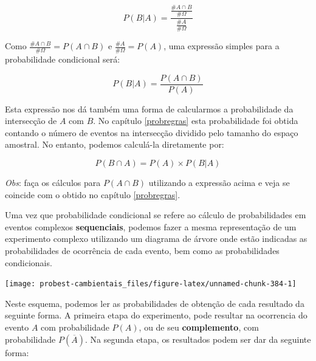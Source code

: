 \documentclass[
]{book}
\begin{document}
\[P(B|A) = \frac{\frac{\#A \cap B}{\#\Omega}}{\frac{\#A}{\#\Omega}}\]

Como \(\frac{\#A \cap B}{\#\Omega} = P(A \cap B)\) e \(\frac{\#A}{\#\Omega} = P(A)\), uma expressão simples para a probabilidade condicional será:

\[P(B|A) = \frac{P(A \cap B)}{P(A)}\]

Esta expressão nos dá também uma forma de calcularmos a probabilidade da intersecção de \(A\) com \(B\). No capítulo \ref{probregras} esta probabilidade foi obtida contando o número de eventos na intersecção dividido pelo tamanho do espaço amostral. No entanto, podemos calculá-la diretamente por:

\[P(B \cap A) = P(A) \times P(B|A)\]

\emph{Obs}: faça os cálculos para \(P(A \cap B)\) utilizando a expressão acima e veja se coincide com o obtido no capítulo \ref{probregras}.

Uma vez que probabilidade condicional se refere ao cálculo de probabilidades em eventos complexos \textbf{sequenciais}, podemos fazer a mesma representação de um experimento complexo utilizando um diagrama de árvore onde estão indicadas as probabilidades de ocorrência de cada evento, bem como as probabilidades condicionais.

\begin{center}\texttt{[image: probest-cambientais\_files/figure-latex/unnamed-chunk-384-1]} \end{center}

Neste esquema, podemos ler as probabilidades de obtenção de cada resultado da seguinte forma. A primeira etapa do experimento, pode resultar na ocorrencia do evento \(A\) com probabilidade \(P(A)\), ou de seu \textbf{complemento}, com probabilidade \(P(\overline{A})\). Na segunda etapa, os resultados podem ser dar da seguinte forma:
\end{document}
